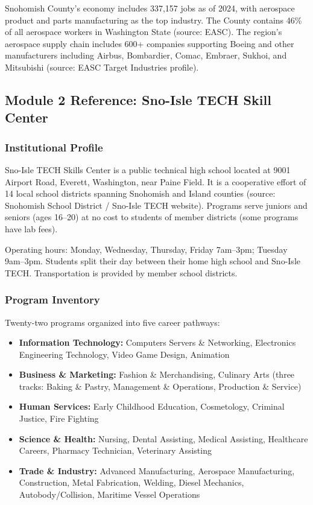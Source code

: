 \documentclass[11pt,letterpaper]{article}
\begin{document}
Snohomish County's economy includes 337,157 jobs as of 2024, with aerospace product and parts manufacturing as the top industry. The County contains 46\% of all aerospace workers in Washington State (source: EASC). The region's aerospace supply chain includes 600+ companies supporting Boeing and other manufacturers including Airbus, Bombardier, Comac, Embraer, Sukhoi, and Mitsubishi (source: EASC Target Industries profile).

\subsection{Module 2 Reference: Sno-Isle TECH Skill Center}

\subsubsection{Institutional Profile}

Sno-Isle TECH Skills Center is a public technical high school located at 9001 Airport Road, Everett, Washington, near Paine Field. It is a cooperative effort of 14 local school districts spanning Snohomish and Island counties (source: Snohomish School District / Sno-Isle TECH website). Programs serve juniors and seniors (ages 16--20) at no cost to students of member districts (some programs have lab fees).

Operating hours: Monday, Wednesday, Thursday, Friday 7am--3pm; Tuesday 9am--3pm. Students split their day between their home high school and Sno-Isle TECH. Transportation is provided by member school districts.

\subsubsection{Program Inventory}

Twenty-two programs organized into five career pathways:
\begin{itemize}[leftmargin=2em]
\item \textbf{Information Technology:} Computers Servers \& Networking, Electronics Engineering Technology, Video Game Design, Animation
\item \textbf{Business \& Marketing:} Fashion \& Merchandising, Culinary Arts (three tracks: Baking \& Pastry, Management \& Operations, Production \& Service)
\item \textbf{Human Services:} Early Childhood Education, Cosmetology, Criminal Justice, Fire Fighting
\item \textbf{Science \& Health:} Nursing, Dental Assisting, Medical Assisting, Healthcare Careers, Pharmacy Technician, Veterinary Assisting
\item \textbf{Trade \& Industry:} Advanced Manufacturing, Aerospace Manufacturing, Construction, Metal Fabrication, Welding, Diesel Mechanics, Autobody/Collision, Maritime Vessel Operations
\end{itemize}
\end{document}
